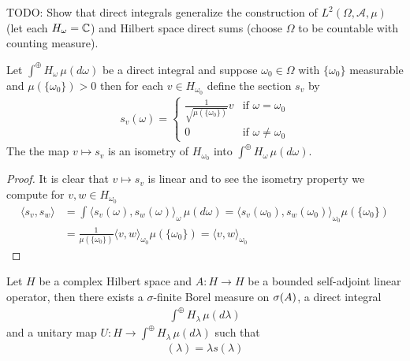 TODO: Show that direct integrals generalize the construction of $L^2(\Omega, \mathcal{A}, \mu)$ (let each $H_\omega = \mathbb{C}$) and Hilbert space direct sums (choose $\Omega$ to be countable with counting measure).

\begin{prop}\label{hilbert:DirectIntegralSubspaces} Let $\int^\oplus H_\omega \, \mu(d\omega)$ be a direct integral and suppose $\omega_0 \in \Omega$ with $\lbrace \omega_0 \rbrace$ measurable and $\mu( \lbrace \omega_0 \rbrace) > 0$ then for each $v \in H_{\omega_0}$ define the section $s_v$ by
\begin{align*}
s_v(\omega) = 
\begin{cases}
\frac{1}{\sqrt{\mu(\lbrace \omega_0 \rbrace)}} v & \text{if $\omega = \omega_0$} \\
0 & \text{if $\omega \neq \omega_0$} 
\end{cases}
\end{align*}
The the map $v \mapsto s_v$ is an isometry of $H_{\omega_0}$ into $\int^\oplus H_\omega \, \mu(d\omega)$.
\end{prop}
\begin{proof}
It is clear that $v \mapsto s_v$ is linear and to see the isometry property
 we compute for $v,w \in H_{\omega_0}$
\begin{align*}
\langle s_v, s_w \rangle &= \int \langle s_v(\omega), s_w(\omega) \rangle_\omega \, \mu(d\omega) = \langle s_v(\omega_0), s_w(\omega_0) \rangle_{\omega_0} \mu(\lbrace \omega_0 \rbrace) \\
&=\frac{1}{\mu(\lbrace \omega_0 \rbrace)} \langle v,w \rangle_{\omega_0} \mu(\lbrace \omega_0 \rbrace) = \langle v,w \rangle_{\omega_0}
\end{align*}
\end{proof}

\begin{thm}\label{hilbert:SpectralTheoremBoundedSelfAdjointDirectIntegral}Let $H$ be a complex Hilbert space and $A : H \to H$ be a bounded self-adjoint linear operator, then there exists a $\sigma$-finite Borel measure on $\sigma(A)$, a direct integral 
\begin{align*}
\int^\oplus H_\lambda \, \mu(d\lambda)
\end{align*}
and a unitary map $U: H \to \int^\oplus H_\lambda \, \mu(d\lambda)$ such that 
\begin{align*}
[UAU^{-1}(s)] (\lambda) = \lambda s(\lambda) 
\end{align*}
\end{thm}


